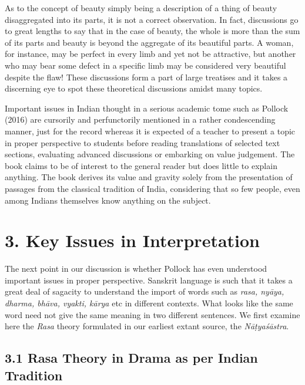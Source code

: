 As to the concept of beauty simply being a description of a thing of beauty disaggregated into its parts, it is not a correct observation. In fact, discussions go to great lengths to say that in the case of beauty, the whole is more than the sum of its parts and beauty is beyond the aggregate of its beautiful parts. A woman, for instance, may be perfect in every limb and yet not be attractive, but another who may bear some defect in a specific limb may be considered very beautiful despite the flaw! These discussions form a part of large treatises and it takes a discerning eye to spot these theoretical discussions amidst many topics.

Important issues in Indian thought in a serious academic tome such as Pollock (2016) are cursorily and perfunctorily mentioned in a rather condescending manner, just for the record whereas it is expected of a teacher to present a topic in proper perspective to students before reading translations of selected text sections, evaluating advanced discussions or embarking on value judgement. The book claims to be of interest to the general reader but does little to explain anything. The book derives its value and gravity solely from the presentation of passages from the classical tradition of India, considering that so few people, even among Indians themselves know anything on the subject.

\vspace{-.3cm}

\section*{3. Key Issues in Interpretation}

The next point in our discussion is whether Pollock has even understood important issues in proper perspective. Sanskrit language is such that it takes a great deal of sagacity to understand the import of words such as \textit{rasa, nyāya, dharma, bhāva, vyakti, kārya} etc in different contexts. What looks like the same word need not give the same meaning in two different sentences. We first examine here the \textit{Rasa} theory formulated in our earliest extant source, the \textit{Nāṭyaśāstra}.

\subsection*{3.1 Rasa Theory in Drama as per Indian Tradition}

